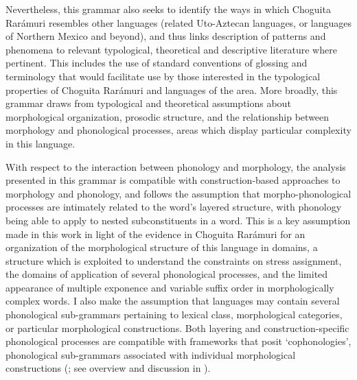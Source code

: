 Nevertheless, this grammar also seeks to identify the ways in which Choguita Rarámuri resembles other languages (related {Uto-Aztecan} languages, or languages of Northern Mexico and beyond), and thus links description of patterns and phenomena to relevant typological, theoretical and descriptive literature where pertinent. This includes the use of standard conventions of glossing and terminology that would facilitate use by those interested in the typological properties of Choguita Rarámuri and languages of the area. More broadly, this grammar draws from typological and theoretical assumptions about morphological organization, prosodic structure, and the relationship between morphology and phonological processes, areas which display particular complexity in this language.

With respect to the interaction between phonology and morphology, the analysis presented in this grammar is compatible with construction-based approaches to morphology and phonology, and follows the assumption that morpho-phon\-ol\-o\-gical processes are intimately related to the word’s layered structure, with phonology being able to apply to nested subconstituents in a word. This is a key assumption made in this work in light of the evidence in Choguita Rarámuri for an organization of the morphological structure of this language in domains, a structure which is exploited to understand the constraints on stress assignment, the domains of application of several phonological processes, and the limited appearance of multiple exponence and variable suffix order in morphologically complex words. I also make the assumption that languages may contain several phonological sub-grammars pertaining to lexical class, morphological categories, or particular morphological constructions. Both layering and construction-specific phonological processes are compatible with frameworks that posit `cophonologies', phonological sub-grammars associated with individual morphological constructions (\citealt{orgun1996sign,anttila2002morphologically,inkelas2005reduplication}; see overview and discussion in \citealt{inkelas2014interplay}).

